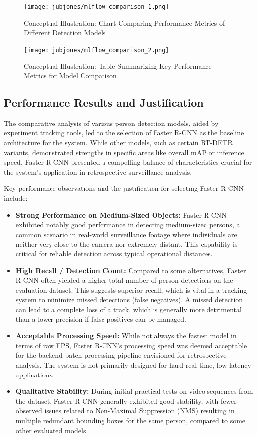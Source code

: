 \begin{figure}[!htb]
    \centering
    \texttt{[image: jubjones/mlflow\_comparison\_1.png]}
    \caption{Conceptual Illustration: Chart Comparing Performance Metrics of Different Detection Models}
    \label{fig:mlflow_comparison_1}
\end{figure}

\begin{figure}[!htb]
    \centering
    \texttt{[image: jubjones/mlflow\_comparison\_2.png]}
    \caption{Conceptual Illustration: Table Summarizing Key Performance Metrics for Model Comparison}
    \label{fig:mlflow_comparison_2}
\end{figure}
\clearpage

\subsection{Performance Results and Justification}
\label{subsection:model_perf_justify_new}
The comparative analysis of various person detection models, aided by experiment tracking tools, led to the selection of Faster R-CNN as the baseline architecture for the \usevar{\srsTitle} system. While other models, such as certain RT-DETR variants, demonstrated strengths in specific areas like overall mAP or inference speed, Faster R-CNN presented a compelling balance of characteristics crucial for the system's application in retrospective surveillance analysis.

Key performance observations and the justification for selecting Faster R-CNN include:
\begin{itemize}
    \item \textbf{Strong Performance on Medium-Sized Objects:} Faster R-CNN exhibited notably good performance in detecting medium-sized persons, a common scenario in real-world surveillance footage where individuals are neither very close to the camera nor extremely distant. This capability is critical for reliable detection across typical operational distances.
    \item \textbf{High Recall / Detection Count:} Compared to some alternatives, Faster R-CNN often yielded a higher total number of person detections on the evaluation dataset. This suggests superior recall, which is vital in a tracking system to minimize missed detections (false negatives). A missed detection can lead to a complete loss of a track, which is generally more detrimental than a lower precision if false positives can be managed.
    \item \textbf{Acceptable Processing Speed:} While not always the fastest model in terms of raw FPS, Faster R-CNN's processing speed was deemed acceptable for the backend batch processing pipeline envisioned for retrospective analysis. The system is not primarily designed for hard real-time, low-latency applications.
    \item \textbf{Qualitative Stability:} During initial practical tests on video sequences from the dataset, Faster R-CNN generally exhibited good stability, with fewer observed issues related to Non-Maximal Suppression (NMS) resulting in multiple redundant bounding boxes for the same person, compared to some other evaluated models.
\end{itemize}

